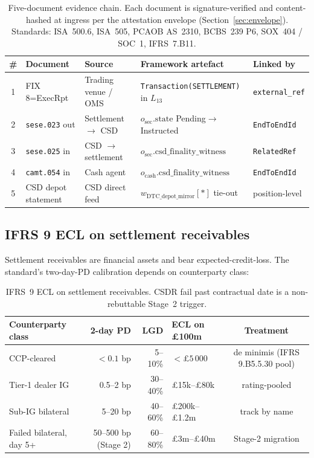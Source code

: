 \documentclass[11pt,a4paper]{article}
\begin{document}
\begin{table}[h]
\centering
\begin{tabular}{cllll}
\toprule
\# & \textbf{Document} & \textbf{Source} & \textbf{Framework artefact} & \textbf{Linked by} \\
\midrule
1 & FIX 8=ExecRpt          & Trading venue / OMS    & \texttt{Transaction(SETTLEMENT)} in $L_{13}$    & \texttt{external\_ref} \\
2 & \texttt{sese.023} out  & Settlement $\to$ CSD   & $o_{\mathrm{sec}}.\mathrm{state}$ Pending$\to$Instructed & \texttt{EndToEndId} \\
3 & \texttt{sese.025} in   & CSD $\to$ settlement   & $o_{\mathrm{sec}}.\mathrm{csd\_finality\_witness}$       & \texttt{RelatedRef} \\
4 & \texttt{camt.054} in   & Cash agent             & $o_{\mathrm{cash}}.\mathrm{csd\_finality\_witness}$      & \texttt{EndToEndId} \\
5 & CSD depot statement    & CSD direct feed        & $w_{\mathrm{DTC\_depot\_mirror}}[*]$ tie-out             & position-level \\
\bottomrule
\end{tabular}
\caption{Five-document evidence chain. Each document is signature-verified and content-hashed at ingress per the attestation envelope (Section~\ref{sec:envelope}). Standards: ISA~500.6, ISA~505, PCAOB AS~2310, BCBS~239 P6, SOX~404 / SOC~1, IFRS~7.B11.}
\end{table}

\subsection{IFRS 9 ECL on settlement receivables}
\label{sec:accounting-ecl}

Settlement receivables are financial assets and bear expected-credit-loss. The standard's two-day-PD calibration depends on counterparty class:

\begin{table}[h]
\centering
\begin{tabular}{lrrlc}
\toprule
\textbf{Counterparty class} & \textbf{2-day PD} & \textbf{LGD} & \textbf{ECL on \pounds 100m} & \textbf{Treatment} \\
\midrule
CCP-cleared              & $< 0.1$ bp        & 5--10\%      & $< \pounds 5\,000$       & de minimis (IFRS 9.B5.5.30 pool) \\
Tier-1 dealer IG         & 0.5--2 bp         & 30--40\%     & \pounds 15k--\pounds 80k & rating-pooled \\
Sub-IG bilateral         & 5--20 bp          & 40--60\%     & \pounds 200k--\pounds 1.2m & track by name \\
Failed bilateral, day 5+ & 50--500 bp (Stage 2) & 60--80\%  & \pounds 3m--\pounds 40m  & Stage-2 migration \\
\bottomrule
\end{tabular}
\caption{IFRS~9 ECL on settlement receivables. CSDR fail past contractual date is a non-rebuttable Stage~2 trigger.}
\end{table}
\end{document}
